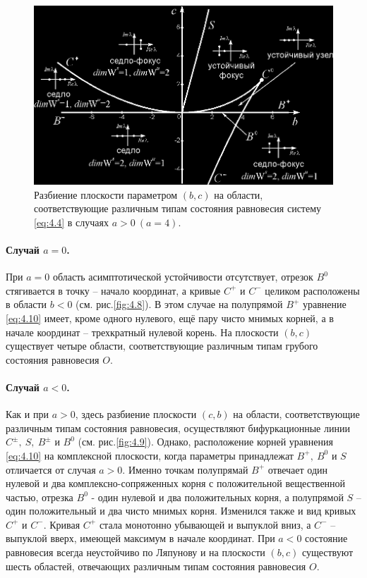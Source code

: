 \begin{figure}[h!]
        \centering
        \includegraphics[width=0.6\linewidth]{fig/lect4/7}
        \caption{Разбиение плоскости параметром $(b,c)$ на области, соответствующие различным типам состояния равновесия систему \eqref{eq:4.4} в случаях $a>0 ~ (a=4)$.}
        \label{fig:4.7}
\end{figure}

\paragraph{Случай $a=0$.}%
\label{par:sluchai_a_0_}
При $a=0$ область асимптотической устойчивости отсутствует, отрезок $B^0$ стягивается в точку -- начало координат, а кривые $C^+$ и $C^-$ целиком расположены в области $b<0$ (см. рис.\ref{fig:4.8}). В этом случае на полупрямой $B^+$ уравнение \eqref{eq:4.10} имеет, кроме одного нулевого, ещё пару чисто мнимых корней, а в начале координат -- трехкратный нулевой корень. На плоскости $(b,c)$ существует четыре области, соответствующие различным типам грубого состояния равновесия $O$. 

\paragraph{Случай $a<0$.}%
\label{par:sluchai_a_0_}

Как и при $a>0$, здесь разбиение плоскости $(c,b)$ на области, соответствующие различным типам состояния равновесия, осуществляют бифуркационные линии $C^{\pm},~S,~B^{\pm}$ и $B^0$ (см. рис.\ref{fig:4.9}). Однако, расположение корней уравнения \eqref{eq:4.10} на комплексной плоскости, когда параметры принадлежат $B^+, ~ B^0$ и $S$ отличается от случая $a>0$. Именно точкам полупрямай $B^+$ отвечает один нулевой и два комплексно-сопряженных корня с положительной вещественной частью, отрезка $B^0$ - один нулевой и два положительных корня, а полупрямой $S$ -- один положительный  и  два чисто мнимых корня. Изменился также и вид кривых $C^+$ и $C^-$. Кривая $C^+$ стала монотонно убывающей
и выпуклой вниз, а $C^-$ -- выпуклой вверх, имеющей максимум в начале координат. При $a<0$ состояние равновесия всегда неустойчиво по Ляпунову и на плоскости $(b,c)$ существуют шесть областей, отвечающих различным типам состояния равновесия $O$.

